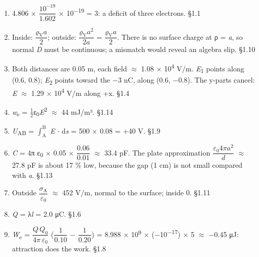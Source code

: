 \documentclass[11pt]{article}
\begin{document}
\begin{keepsection}
\begin{enumerate}
\item 4.806 \ensuremath{\times} {\small\ensuremath{\dfrac{10^{-19}}{1.602}}} \ensuremath{\times} 10\textsuperscript{\ensuremath{-}19} = 3: a deficit of three electrons. \hfill{\small\color{FAUblue}§1.1}
\item Inside: {\small\ensuremath{\dfrac{ϱ_{\mathrm{V}}{a}}{2}}}; outside: {\small\ensuremath{\dfrac{ϱ_{\mathrm{V}}{a}^{2}}{2{a}}}} = {\small\ensuremath{\dfrac{ϱ_{\mathrm{V}}{a}}{2}}}. There is no surface charge at ρ = \textit{a}, so normal \textit{D} must be continuous; a mismatch would reveal an algebra slip. \hfill{\small\color{FAUblue}§1.10}
\item Both distances are 0.05 m, each field \ensuremath{\approx} 1.08 \ensuremath{\times} 10\textsuperscript{4} V/m. \textit{E}\textsubscript{1} points along (0.6, 0.8); \textit{E}\textsubscript{2} points toward the \ensuremath{-}3 nC, along (0.6, \ensuremath{-}0.8). The y-parts cancel: \textit{E} \ensuremath{\approx} 1.29 \ensuremath{\times} 10\textsuperscript{4} V/m along +x. \hfill{\small\color{FAUblue}§1.4}
\item \textit{w}\textsubscript{e} = \ensuremath{\tfrac12}ε\textsubscript{0}\textit{E}\textsuperscript{2} \ensuremath{\approx} 44 mJ/m³. \hfill{\small\color{FAUblue}§1.14}
\item \textit{U}\textsubscript{AB} = $\int_{\mathrm{A}}^{\mathrm{B}} $ \textit{E} \ensuremath{\cdot} d\textit{s} = 500 \ensuremath{\times} 0.08 = +40 V. \hfill{\small\color{FAUblue}§1.9}
\item \textit{C} = 4π ε\textsubscript{0} \ensuremath{\times} 0.05 \ensuremath{\times} {\small\ensuremath{\dfrac{0.06}{0.01}}} \ensuremath{\approx} 33.4 pF. The plate approximation {\small\ensuremath{\dfrac{ε_{0}4π{a}^{2}}{{d}}}} \ensuremath{\approx} 27.8 pF is about 17 \% low, because the gap (1 cm) is not small compared with \textit{a}. \hfill{\small\color{FAUblue}§1.13}
\item Outside {\small\ensuremath{\dfrac{σ_{\mathrm{A}}}{ε_{0}}}} \ensuremath{\approx} 452 V/m, normal to the surface; inside 0. \hfill{\small\color{FAUblue}§1.11}
\item \textit{Q} = λ\textit{l} = 2.0 μC. \hfill{\small\color{FAUblue}§1.6}
\item \textit{W}\textsubscript{e} = {\small\ensuremath{\dfrac{{Q\,Q}_{0}}{4π\, ε_{0}}}} ({\small\ensuremath{\dfrac{1}{0.10}}} \ensuremath{-} {\small\ensuremath{\dfrac{1}{0.20}}}) = 8.988 \ensuremath{\times} 10\textsuperscript{9} \ensuremath{\times} (\ensuremath{-}10\textsuperscript{\ensuremath{-}17}) \ensuremath{\times} 5 \ensuremath{\approx} \ensuremath{-}0.45 μJ: attraction does the work. \hfill{\small\color{FAUblue}§1.8}

\end{enumerate}
\end{keepsection}
\end{document}
